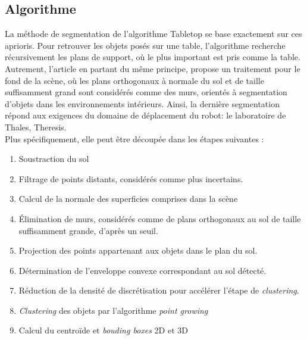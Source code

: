 \subsection{Algorithme}

La méthode de segmentation de l’algorithme Tabletop
se base exactement sur ces aprioris. Pour retrouver les objets posés
sur une table, l'algorithme recherche récursivement les plans de
support, où le plus important est pris comme la table. Autrement,
l'article \cite{caron2014neural} en partant du même principe, propose un
traitement pour le fond de la scène, où les plans orthogonaux à
normale du sol et de taille suffisamment grand sont considérés comme
des murs, orientés à segmentation d'objets dans les environnements
intérieurs. Ainsi, la dernière segmentation répond aux exigences du domaine de déplacement du robot: le
laboratoire de Thales, Theresis.\\

Plus spécifiquement, elle peut être découpée dans les étapes suivantes :
\begin{enumerate}
\item Soustraction du sol

\item Filtrage de points distants, considérés comme plus incertains.

\item Calcul de la normale des superficies comprises dans la scène

\item Élimination de murs, considérés comme de plans orthogonaux au
  sol de taille suffisamment grande, d'après un seuil.

\item Projection des points appartenant aux objets dans le plan du
  sol.

\item Détermination de l’enveloppe convexe correspondant au sol détecté.

\item Réduction de la densité de discrétisation pour accélérer l'étape
  de \textit{clustering}.

\item \textit{Clustering} des objets par l'algorithme \textit{point growing}

\item Calcul du centroïde et \textit{bouding boxes} 2D et 3D \\

\end{enumerate}

